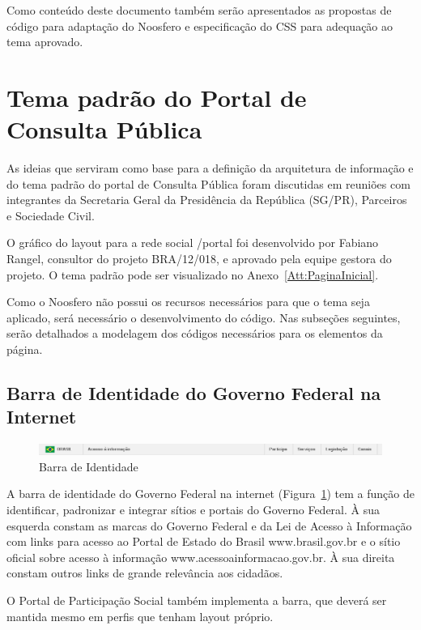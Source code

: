 \documentclass[[a4paper,11pt]{article}
\begin{document}
Como conteúdo deste documento também serão apresentados as propostas de
código para adaptação do Noosfero e especificação do CSS para adequação
ao tema aprovado.

\section{Tema padrão do Portal de Consulta Pública}

As ideias que serviram como base para a definição da arquitetura de
informação e do tema padrão do portal de Consulta Pública foram
discutidas em reuniões com integrantes da Secretaria Geral da
Presidência da República (SG/PR), Parceiros e Sociedade Civil.

O gráfico do layout para a rede social
/portal foi desenvolvido por Fabiano Rangel, consultor do projeto
BRA/12/018, e aprovado pela equipe gestora do projeto. O tema padrão
pode ser visualizado no
Anexo~\ref{Att:PaginaInicial}.

Como o Noosfero não possui os recursos necessários para que o tema seja
aplicado, será necessário o desenvolvimento do código. Nas subseções
seguintes, serão
detalhados a modelagem dos códigos necessários para os elementos da
página.

\subsection{Barra de Identidade do Governo Federal na Internet}

\begin{figure}[h]
\center
\includegraphics[scale=0.5]{barra-governo.png}
\caption{Barra de Identidade}
\label{fig:barra-governo}
\end{figure}

A barra de identidade do Governo Federal na internet
(Figura~\ref{fig:barra-governo}) tem a função de identificar, padronizar
e integrar sítios e
portais do Governo Federal. À sua esquerda constam as marcas do Governo
Federal e da Lei de Acesso à Informação com links para acesso ao Portal
de Estado do Brasil www.brasil.gov.br e o sítio oficial sobre acesso à
informação www.acessoainformacao.gov.br. À sua direita constam outros
links de grande relevância aos cidadãos.

O Portal de Participação Social também implementa a barra, que deverá
ser mantida mesmo em perfis que tenham layout próprio.
\end{document}
